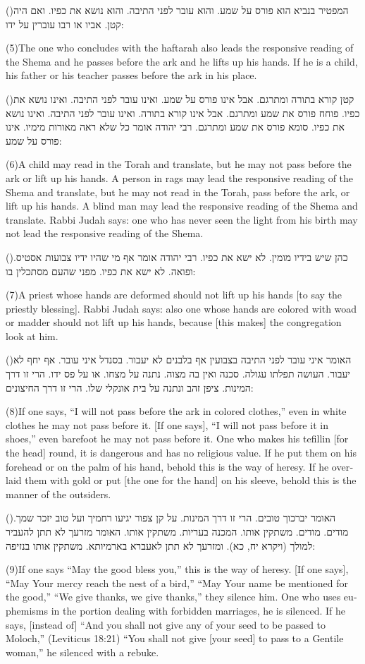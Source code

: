 \documentclass[12pt, openany]{book}
\newcommand{\sethebfont}{
\fontsize{10.5pt}{13.1pt} \selectfont
}
\newcommand{\hebeng}[2]{
	{\sethebfont #1\\}
	
	\begin{english}
		#2
	\end{english}
	\clearpage
}
\newcommand{\vsnum}[1]{(\hebrewnumeral{#1})\space}
\newcommand{\vsnumeng}[1]{(#1)\space}
\begin{document}
\hebeng{\vsnum{5}המפטיר בנביא הוא פורס על שמע. והוא עובר לפני התיבה. והוא נושא את כפיו. ואם היה קטן. אביו או רבו עוברין על ידו: }{\vsnumeng{5}The one who concludes with the haftarah also leads the responsive reading of the Shema and he passes before the ark and he lifts up his hands. If he is a child, his father or his teacher passes before the ark in his place.}%

\hebeng{\vsnum{6}קטן קורא בתורה ומתרגם. אבל אינו פורס על שמע. ואינו עובר לפני התיבה. ואינו נושא את כפיו. פוחח פורס את שמע ומתרגם. אבל אינו קורא בתורה. ואינו עובר לפני התיבה. ואינו נושא את כפיו. סומא פורס את שמע ומתרגם. רבי יהודה אומר כל שלא ראה מאורות מימיו. אינו פורס על שמע: }{\vsnumeng{6}A child may read in the Torah and translate, but he may not pass before the ark or lift up his hands. A person in rags may lead the responsive reading of the Shema and translate, but he may not read in the Torah, pass before the ark, or lift up his hands. A blind man may lead the responsive reading of the Shema and translate. Rabbi Judah says: one who has never seen the light from his birth may not lead the responsive reading of the Shema.}%

\hebeng{\vsnum{7}כהן שיש בידיו מומין. לא ישא את כפיו. רבי יהודה אומר אף מי שהיו ידיו צבועות אסטיס. ופואה. לא ישא את כפיו. מפני שהעם מסתכלין בו: }{\vsnumeng{7}A priest whose hands are deformed should not lift up his hands {[to say the priestly blessing]}. Rabbi Judah says: also one whose hands are colored with woad or madder should not lift up his hands, because {[this makes]} the congregation look at him.}%

\hebeng{\vsnum{8}האומר איני עובר לפני התיבה בצבועין אף בלבנים לא יעבור. בסנדל איני עובר. אף יחף לא יעבור. העושה תפלתו עגולה. סכנה ואין בה מצוה. נתנה על מצחו. או על פס ידו. הרי זו דרך המינות. ציפן זהב ונתנה על בית אונקלי שלו. הרי זו דרך החיצונים: }{\vsnumeng{8}If one says, “I will not pass before the ark in colored clothes,” even in white clothes he may not pass before it. {[If one says]}, “I will not pass before it in shoes,” even barefoot he may not pass before it. One who makes his tefillin {[for the head]} round, it is dangerous and has no religious value. If he put them on his forehead or on the palm of his hand, behold this is the way of heresy. If he overlaid them with gold or put {[the one for the hand]} on his sleeve, behold this is the manner of the outsiders.}%

\hebeng{\vsnum{9}האומר יברכוך טובים. הרי זו דרך המינות. על קן צפור יגיעו רחמיך ועל טוב יזכר שמך. מודים. מודים. משתקין אותו. המכנה בעריות. משתקין אותו. האומר מזרעך לא תתן להעביר למולך (ויקרא יח, כא). ומזרעך לא תתן לאעברא בארמיותא. משתקין אותו בנזיפה: }{\vsnumeng{9}If one says “May the good bless you,” this is the way of heresy. {[If one says]}, “May Your mercy reach the nest of a bird,” “May Your name be mentioned for the good,” “We give thanks, we give thanks,” they silence him. One who uses euphemisms in the portion dealing with forbidden marriages, he is silenced. If he says, {[instead of]} “And you shall not give any of your seed to be passed to Moloch,” (Leviticus 18:21) “You shall not give {[your seed]} to pass to a Gentile woman,” he silenced with a rebuke.}%
\end{document}
